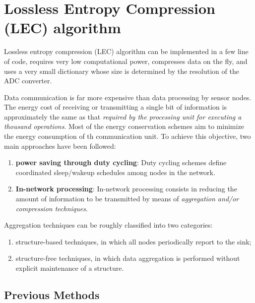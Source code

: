 \chapter{Lossless Entropy Compression (LEC) algorithm}
\label{chapLEC}
Lossless entropy compression (LEC) algorithm can be implemented in \textcolor[rgb]{1,0,0}{a few line of code}, requires \textcolor[rgb]{1,0,0}{very low computational power}, \textcolor[rgb]{1,0,0}{compresses data on the fly}, and \textcolor[rgb]{1,0,0}{uses a very small dictionary whose size is determined by the resolution of the ADC converter}. 

Data communication is far more expensive than data processing by sensor nodes. The energy cost of receiving or transmitting a single bit of information is approximately the same as that \emph{\textcolor[rgb]{1,0,0}{required by the processing unit for executing a thousand operations}}. Most of the energy conservation schemes aim to minimize the energy consumption of th communication unit. To achieve this objective, two main approaches have been followed:
\begin{enumerate}
    \item \textbf{\textcolor[rgb]{1,0,0}{power saving through duty cycling}}: Duty cycling schemes define coordinated sleep/wakeup schedules among nodes in the network. \cite{Anastasi2009}
    \item \textbf{\textcolor[rgb]{1,0,0}{In-network processing}}: In-network processing consists in reducing the amount of information to be transmitted by means of \emph{\textcolor[rgb]{1,0,0}{aggregation and/or compression techniques}}. 
\end{enumerate}

Aggregation techniques can be roughly classified into two categories: 
\begin{enumerate}
    \item structure-based techniques, in which all nodes periodically report to the sink;
    \item structure-free techniques, in which data aggregation is performed without explicit maintenance of a structure.
\end{enumerate}

\section{Previous Methods}

